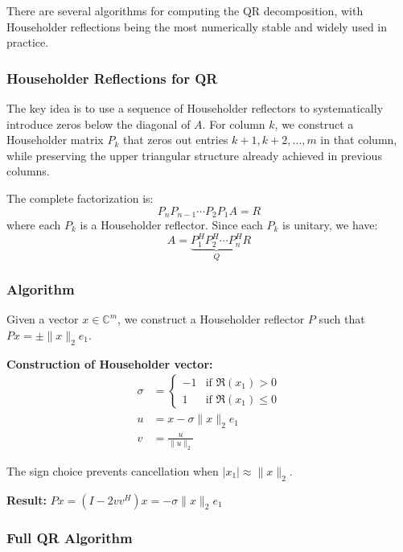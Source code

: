 There are several algorithms for computing the QR decomposition, with Householder reflections being the most numerically stable and widely used in practice.

\subsubsection{Householder Reflections for QR}

The key idea is to use a sequence of Householder reflectors to systematically introduce zeros below the diagonal of $A$. For column $k$, we construct a Householder matrix $P_k$ that zeros out entries $k+1, k+2, \ldots, m$ in that column, while preserving the upper triangular structure already achieved in previous columns.

The complete factorization is:
\begin{equation}
    P_n P_{n-1} \cdots P_2 P_1 A = R
\end{equation}
where each $P_k$ is a Householder reflector. Since each $P_k$ is unitary, we have:
\begin{equation}
    A = \underbrace{P_1^H P_2^H \cdots P_n^H}_{Q} R
\end{equation}

\subsubsection{Algorithm}

Given a vector $x \in \mathbb{C}^m$, we construct a Householder reflector $P$ such that $Px = \pm\|x\|_2 e_1$.

\textbf{Construction of Householder vector:}
\begin{align}
    \sigma & = \begin{cases}
                   -1 & \text{if } \Re(x_1) > 0    \\
                   1  & \text{if } \Re(x_1) \leq 0
               \end{cases} \\
    u      & = x - \sigma \|x\|_2 e_1          \\
    v      & = \frac{u}{\|u\|_2}
\end{align}

The sign choice prevents cancellation when $|x_1| \approx \|x\|_2$.

\textbf{Result:} $P x = (I - 2vv^H)x = -\sigma \|x\|_2 e_1$

\subsubsection{Full QR Algorithm}

